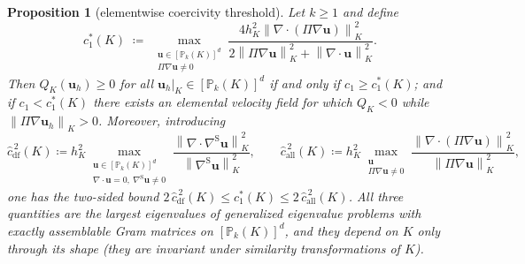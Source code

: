 \documentclass[11pt,a4paper]{article}
\newtheorem{proposition}{Proposition}
\theoremstyle{remark}
\newcommand{\PP}{\mathbb{P}}
\newcommand{\nK}[1]{\left\lVert #1 \right\rVert_{K}}
\newcommand{\symgrad}{\nabla^{\mathrm{S}}}
\newcommand{\Proj}{\Pi}
\newcommand{\chat}{\hat{c}}
\begin{document}
\begin{proposition}[elementwise coercivity threshold]
\label{prop:threshold}
Let $k \ge 1$ and define
%
\begin{equation}
\label{eq:c1star}
c_1^*(K)
 \;\coloneqq\;
 \max_{\substack{\boldsymbol u \in [\PP_k(K)]^d \\
                  \Proj\nabla\boldsymbol u \neq 0}}
 \frac{4 h_K^2 \nK{\nabla\!\cdot\!(\Proj\nabla\boldsymbol u)}^2}
      {2\nK{\Proj\nabla\boldsymbol u}^2
       + \nK{\nabla\!\cdot\!\boldsymbol u}^2}.
\end{equation}
%
Then $Q_K(\boldsymbol u_h) \ge 0$ for all
$\boldsymbol u_h\vert_K \in [\PP_k(K)]^d$ if and only if
$c_1 \ge c_1^*(K)$; and if $c_1 < c_1^*(K)$ there exists an elemental
velocity field for which $Q_K < 0$ while
$\nK{\Proj\nabla\boldsymbol u_h} > 0$. Moreover, introducing
%
\begin{equation}
\label{eq:chat}
\chat^{\,2}_{\mathrm{df}}(K)
 \coloneqq h_K^2 \max_{\substack{\boldsymbol u \in [\PP_k(K)]^d\\
   \nabla\cdot\boldsymbol u = 0,\ \symgrad\boldsymbol u \neq 0}}
 \frac{\nK{\nabla\!\cdot\!\symgrad\boldsymbol u}^2}
      {\nK{\symgrad\boldsymbol u}^2},
 \qquad
\chat^{\,2}_{\mathrm{all}}(K)
 \coloneqq h_K^2 \max_{\substack{\boldsymbol u\\ \Proj\nabla
   \boldsymbol u\neq 0}}
 \frac{\nK{\nabla\!\cdot\!(\Proj\nabla\boldsymbol u)}^2}
      {\nK{\Proj\nabla\boldsymbol u}^2},
\end{equation}
%
one has the two-sided bound
$2\,\chat^{\,2}_{\mathrm{df}}(K) \le c_1^*(K) \le
 2\,\chat^{\,2}_{\mathrm{all}}(K)$.
All three quantities are the largest eigenvalues of generalized
eigenvalue problems with exactly assemblable Gram matrices on
$[\PP_k(K)]^d$, and they depend on $K$ only through its shape (they are
invariant under similarity transformations of $K$).
\end{proposition}
\end{document}
